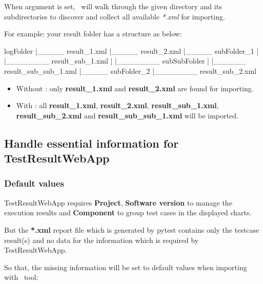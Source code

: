     When  argument is set, \pkg\ will walk through the given
    directory and its subdirectories to discover and collect all available
    \emph{*.xml} for importing.

    For example: your result folder has a structure as below:

\begin{robotlog}
logFolder
   |_____ result_1.xml
   |_____ result_2.xml
   |_____ subFolder_1
   |         |________ result_sub_1.xml
   |         |________ subSubFolder
   |                       |______ result_sub_sub_1.xml
   |_____ subFolder_2
             |________ result_sub_2.xml
\end{robotlog}

    \begin{itemize}
    \tightlist
    \item
      Without : only \textbf{result\_1.xml} and
      \textbf{result\_2.xml} are found for importing.
    \item
      With : all \textbf{result\_1.xml},
      \textbf{result\_2.xml}, \textbf{result\_sub\_1.xml},
      \textbf{result\_sub\_2.xml} and \textbf{result\_sub\_sub\_1.xml} will
      be imported.
    \end{itemize}

  \hypertarget{handle-required-information}{%
  \subsection{Handle essential information for TestResultWebApp}
  \label{handle-required-information}}

  \hypertarget{default-values}{%
  \subsubsection{Default values}
  \label{default-values}}
    TestResultWebApp requires \textbf{Project}, \textbf{Software version} to
    manage the execution results and \textbf{Component} to group test cases in
    the displayed charts.

    But the \textbf{*.xml} report file which is generated by pytest contains
    only the testcase result(s) and no data for the information which is
    required by TestResultWebApp.

    So that, the missing information will be set to default values when
    importing with \pkg\ tool:

